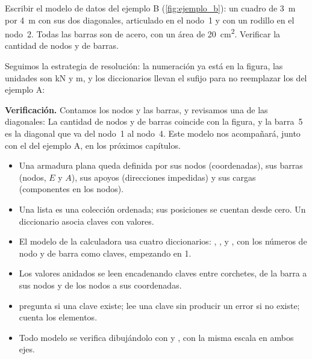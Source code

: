 \begin{problemaresuelto}
Escribir el modelo de datos del ejemplo B (\cref{fig:ejemplo_b}): un cuadro
de \SI{3}{\metre} por \SI{4}{\metre} con sus dos diagonales, articulado en el
nodo~1 y con un rodillo en el nodo~2. Todas las barras son de acero, con un
área de \SI{20}{\centi\metre\squared}. Verificar la cantidad de nodos y de
barras.

\solucion
Seguimos la estrategia de resolución: la numeración ya está en la figura, las
unidades son \si{\kilo\newton} y \si{\metre}, y los diccionarios llevan el
sufijo  para no reemplazar los del ejemplo A:

\textbf{Verificación.} Contamos los nodos y las barras, y revisamos una de
las diagonales:
La cantidad de nodos y de barras coincide con la figura, y la barra~5 es la
diagonal que va del nodo~1 al nodo~4. Este modelo nos acompañará, junto con el
del ejemplo A, en los próximos capítulos.
\end{problemaresuelto}

\repasoyresumen

\begin{itemize}
  \item Una armadura plana queda definida por sus nodos (coordenadas), sus
    barras (nodos, $E$ y $A$), sus apoyos (direcciones impedidas) y sus cargas
    (componentes en los nodos).
  \item Una lista es una colección ordenada; sus posiciones se cuentan desde
    cero. Un diccionario asocia claves con valores.
  \item El modelo de la calculadora usa cuatro diccionarios: ,
    ,  y , con los números de nodo y de
    barra como claves, empezando en 1.
  \item Los valores anidados se leen encadenando claves entre corchetes,
    de la barra a sus nodos y de los nodos a sus coordenadas.
  \item {} pregunta si una clave existe;  lee una clave sin
    producir un error si no existe;  cuenta los elementos.
  \item Todo modelo se verifica dibujándolo con  y
    , con la misma escala en ambos ejes.
\end{itemize}

